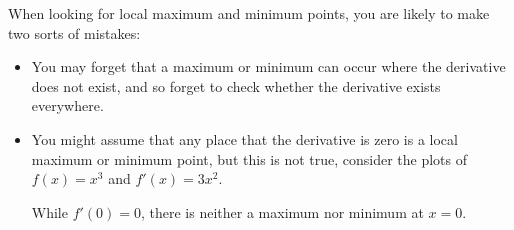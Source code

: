\documentclass{ximera}
\begin{document}
\begin{warning} 
When looking for local maximum and minimum points, you are likely to
make two sorts of mistakes: 
\begin{itemize}
\item You may forget that a maximum or minimum can occur where the
  derivative does not exist, and so forget to check whether the
  derivative exists everywhere. 
\item You might assume that any place that the derivative is zero is a
  local maximum or minimum point, but this is not true, consider the
  plots of $f(x) = x^3$ and $f'(x) = 3x^2$.
\begin{image}
\end{image}
While $f'(0)=0$, there is neither a maximum nor minimum at $x=0$.
\end{itemize}
\end{warning}
\end{document}
